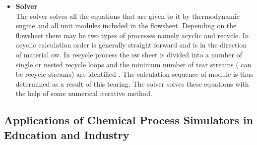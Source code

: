 \documentclass[12pt]{report}
\begin{document}
\begin{itemize}
\item{\textbf{Solver}} \\
The solver solves all the equations that are given to it by thermodynamic engine and all unit modules included in the flowsheet. Depending on the flowsheet there may be two types of processes namely acyclic and recycle. In acyclic calculation order is generally straight forward and is in the direction of material ow. In recycle process the ow sheet is divided into a number of single or nested recycle loops and the minimum number of tear streams ( can be recycle streams) are identified  . The calculation sequence of module is thus determined as a result of this tearing. The solver solves these equations with the help of some numerical iterative method.
\end{itemize}

\subsection{Applications of Chemical Process Simulators in Education and Industry}
\end{document}
